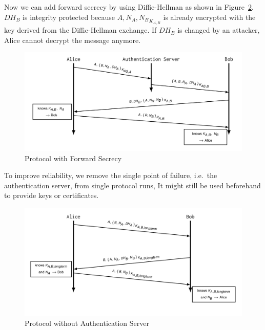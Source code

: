Now we can add forward secrecy by using Diffie-Hellman as shown in Figure~\ref{fig:ooppt3}.
$DH_B$ is integrity protected because ${A, N_A, N_B}_{K_{A,B}}$ is already encrypted with the key derived from the Diffie-Hellman exchange.
If $DH_B$ is changed by an attacker, Alice cannot decrypt the message anymore.
\begin{figure}[H]
  \centering
  \includegraphics[width=\textwidth]{figures/ooppt3.png}
  \caption{Protocol with Forward Secrecy}\label{fig:ooppt3}
\end{figure}

To improve reliability, we remove the single point of failure, i.e.\ the authentication server, from single protocol runs, 
It might still be used beforehand to provide keys or certificates.
\begin{figure}[H]
  \centering
  \includegraphics[width=\textwidth]{figures/ooppt4.png}
  \caption{Protocol without Authentication Server}\label{fig:ooppt3}
\end{figure}
\newpage

